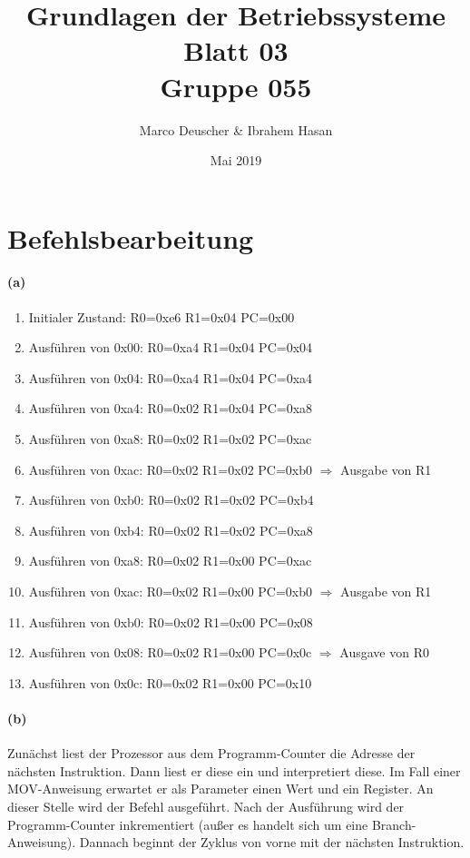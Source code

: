 \documentclass[a4paper]{article}
\title{Grundlagen der Betriebssysteme\\ Blatt 03 \\ Gruppe 055}
\author{Marco Deuscher & Ibrahem Hasan}
\date{Mai 2019}
\begin{document}
\maketitle

\section{Befehlsbearbeitung}
\paragraph{(a)}

\begin{enumerate}
	\item Initialer Zustand: R0=0xe6 R1=0x04 PC=0x00
	\item Ausführen von 0x00: R0=0xa4 R1=0x04 PC=0x04
	\item Ausführen von 0x04: R0=0xa4 R1=0x04 PC=0xa4 
	\item Ausführen von 0xa4: R0=0x02 R1=0x04 PC=0xa8
	\item Ausführen von 0xa8: R0=0x02 R1=0x02 PC=0xac
	\item Ausführen von 0xac: R0=0x02 R1=0x02 PC=0xb0 $\Rightarrow$ Ausgabe von R1
	\item Ausführen von 0xb0: R0=0x02 R1=0x02 PC=0xb4
	\item Ausführen von 0xb4: R0=0x02 R1=0x02 PC=0xa8
	\item Ausführen von 0xa8: R0=0x02 R1=0x00 PC=0xac
	\item Ausführen von 0xac: R0=0x02 R1=0x00 PC=0xb0 $\Rightarrow$ Ausgabe von R1
	\item Ausführen von 0xb0: R0=0x02 R1=0x00 PC=0x08
	\item Ausführen von 0x08: R0=0x02 R1=0x00 PC=0x0c $\Rightarrow$ Ausgave von R0
	\item Ausführen von 0x0c: R0=0x02 R1=0x00 PC=0x10
\end{enumerate}


\paragraph{(b)}
Zunächst liest der Prozessor aus dem Programm-Counter die Adresse der nächsten Instruktion. Dann liest er diese ein und interpretiert diese. Im Fall einer MOV-Anweisung erwartet er als Parameter einen Wert und ein Register. An dieser Stelle wird der Befehl ausgeführt. Nach der Ausführung wird der Programm-Counter inkrementiert (außer es handelt sich um eine Branch-Anweisung). Dannach beginnt der Zyklus von vorne mit der nächsten Instruktion.
\end{document}
